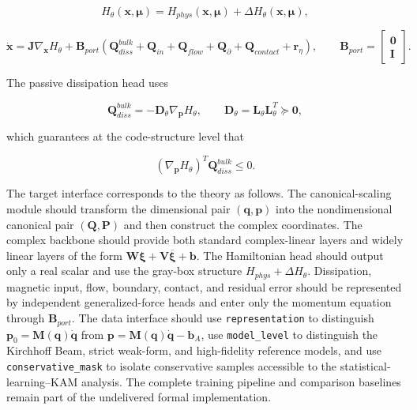 \begin{equation}
\label{eq:chnn-4-31}
H_{\theta}\left( \mathbf{x},\bm{\mu} \right) = H_{phys}\left( \mathbf{x},\bm{\mu} \right) + \Delta H_{\theta}\left( \mathbf{x},\bm{\mu} \right),
\end{equation}

\begin{equation}
\label{eq:chnn-4-32}
\dot{\mathbf{x}} = \mathbf{J}\nabla_{\mathbf{x}}H_{\theta} + \mathbf{B}_{port}\left( \mathbf{Q}_{diss}^{bulk} + \mathbf{Q}_{in} + \mathbf{Q}_{flow} + \mathbf{Q}_{\partial} + \mathbf{Q}_{contact} + \mathbf{r}_{\eta} \right),\quad\quad\mathbf{B}_{port} = \begin{bmatrix}
\mathbf{0} \\
\mathbf{I}
\end{bmatrix}.
\end{equation}

The passive dissipation head uses

\begin{equation}
\label{eq:chnn-4-33}
\mathbf{Q}_{diss}^{bulk} = - \mathbf{D}_{\theta}\nabla_{\mathbf{p}}H_{\theta},\quad\quad\mathbf{D}_{\theta} = \mathbf{L}_{\theta}\mathbf{L}_{\theta}^{T} \succcurlyeq \mathbf{0},
\end{equation}

which guarantees at the code-structure level that

\begin{equation}
\label{eq:chnn-4-34}
\left( \nabla_{\mathbf{p}}H_{\theta} \right)^{T}\mathbf{Q}_{diss}^{bulk} \leq 0.
\end{equation}

The target interface corresponds to the theory as follows. The canonical-scaling module should transform the dimensional pair \(\left(\mathbf{q},\mathbf{p}\right)\) into the nondimensional canonical pair \(\left(\mathbf{Q},\mathbf{P}\right)\) and then construct the complex coordinates. The complex backbone should provide both standard complex-linear layers and widely linear layers of the form \(\mathbf{W}\bm{\xi}+\mathbf{V}\overline{\bm{\xi}}+\mathbf{b}\). The Hamiltonian head should output only a real scalar and use the gray-box structure \(H_{phys}+\Delta H_{\theta}\). Dissipation, magnetic input, flow, boundary, contact, and residual error should be represented by independent generalized-force heads and enter only the momentum equation through \(\mathbf{B}_{port}\). The data interface should use \texttt{representation} to distinguish \(\mathbf{p}_{0} = \mathbf{M}\left( \mathbf{q} \right)\dot{\mathbf{q}}\) from \(\mathbf{p} = \mathbf{M}\left( \mathbf{q} \right)\dot{\mathbf{q}} - \mathbf{b}_{A}\), use \texttt{model\_level} to distinguish the Kirchhoff Beam, strict weak-form, and high-fidelity reference models, and use \texttt{conservative\_mask} to isolate conservative samples accessible to the statistical-learning--KAM analysis. The complete training pipeline and comparison baselines remain part of the undelivered formal implementation.

